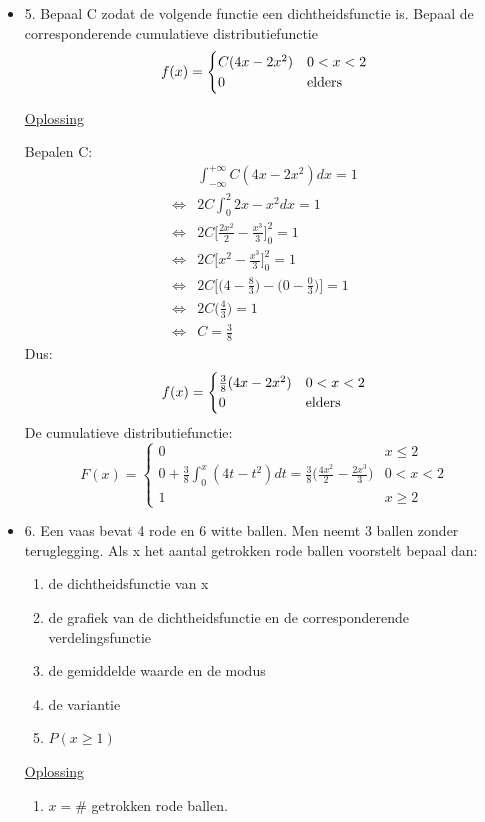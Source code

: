 \documentclass[12pt]{report}
\newcommand{\exercise}[2]{
  #1
  

  \underline{Oplossing}
  
  #2
  
    \hrulefill
}
\begin{document}
\begin{itemize}
{{}}
 \item{\exercise{5. Bepaal C zodat de volgende functie een dichtheidsfunctie is. Bepaal de corresponderende cumulatieve distributiefunctie
 $$f(x) = \begin{cases}
           C(4x - 2x^2) & 0 < x < 2 \\
           0 & \hbox{elders}
          \end{cases}
$$}{
Bepalen C:
\begin{equation*}
 \begin{split}
  & \int_{-\infty}^{+\infty}C(4x-2x^2)dx = 1 \\
  \Leftrightarrow & 2C\int_{0}^{2}2x-x^2dx = 1 \\
  \Leftrightarrow & 2C\bigg[\frac{2x^2}{2} - \frac{x^3}{3}\bigg]_0^2 = 1 \\
  \Leftrightarrow & 2C\bigg[x^2 - \frac{x^3}{3}\bigg]_0^2 = 1 \\
  \Leftrightarrow & 2C\bigg[\bigg(4 - \frac{8}{3}\bigg) - \bigg(0 - \frac{0}{3}\bigg)\bigg]= 1 \\
  \Leftrightarrow & 2C\bigg(\frac{4}{3}\bigg)= 1 \\
  \Leftrightarrow & C = \frac{3}{8}
 \end{split}
\end{equation*}
Dus:
 $$f(x) = \begin{cases}
           \frac{3}{8}(4x - 2x^2) & 0 < x < 2 \\
           0 & \hbox{elders}
          \end{cases}
$$
De cumulatieve distributiefunctie:
$$F(x) = \begin{cases}
          0 & x \leq 2 \\ 
          0 + \frac{3}{8}\int_0^x (4t - t^2)dt = \frac{3}{8}\bigg(\frac{4x^2}{2} - \frac{2x^3}{3}\bigg) & 0 < x < 2 \\
          1 & x \geq 2
         \end{cases}
$$
}}
 \item{\exercise{6. Een vaas bevat 4 rode en 6 witte ballen. Men neemt 3 ballen zonder teruglegging. Als x het aantal getrokken rode ballen voorstelt bepaal dan:
    \begin{enumerate}
     \item de dichtheidsfunctie van x
     \item de grafiek van de dichtheidsfunctie en de corresponderende verdelingsfunctie 
     \item de gemiddelde waarde en de modus
     \item de variantie
     \item $P(x \geq 1)$
    \end{enumerate}
}{
    \begin{enumerate}
     \item  $x = \# $ getrokken rode ballen.
     

\end{enumerate}}}
\end{itemize}
\end{document}
